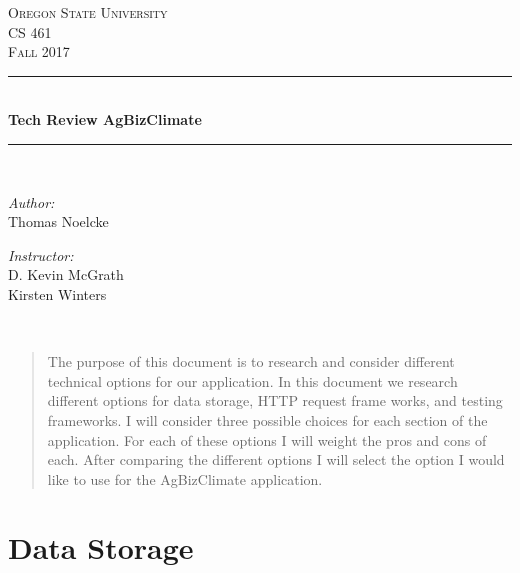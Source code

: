 \documentclass[letterpaper,10pt]{article}
\begin{document}
    \begin{titlepage}
    \newcommand{\HRule}{\rule{\linewidth}{0.5mm}}
    \center
    \textsc{\Large Oregon State University}\\[1.5cm]
    \textsc{\Large CS 461}\\[0.5cm]
    \textsc{\Large Fall 2017}\\[0.5cm]
    \HRule \\[0.4cm]
    { \huge \bfseries Tech Review AgBizClimate}\\[0.4cm] %
    \HRule \\[1.5cm]
    \begin{minipage}{0.4\textwidth}
        \begin{flushleft} \large
        \emph{Author:}\\
        Thomas Noelcke
        \end{flushleft}
    \end{minipage}
    \begin{minipage}{0.4\textwidth}
        \begin{flushright} \large
        \emph{Instructor:} \\
        D. Kevin McGrath\\
        Kirsten Winters
        \end{flushright}
    \end{minipage}\\[2cm]
    \begin{abstract}
    \item 
		The purpose of this document is to research and consider different technical options for our application. In this document we research different options for data storage, HTTP request frame works, and testing frameworks. I will consider three possible choices for each section of the application. For each of these options I will weight the pros and cons of each. After comparing the different options I will select the option I would like to use for the AgBizClimate application.
    \end{abstract}
    \vfill %
    \end{titlepage}
		
\section{Data Storage}
\end{document}
